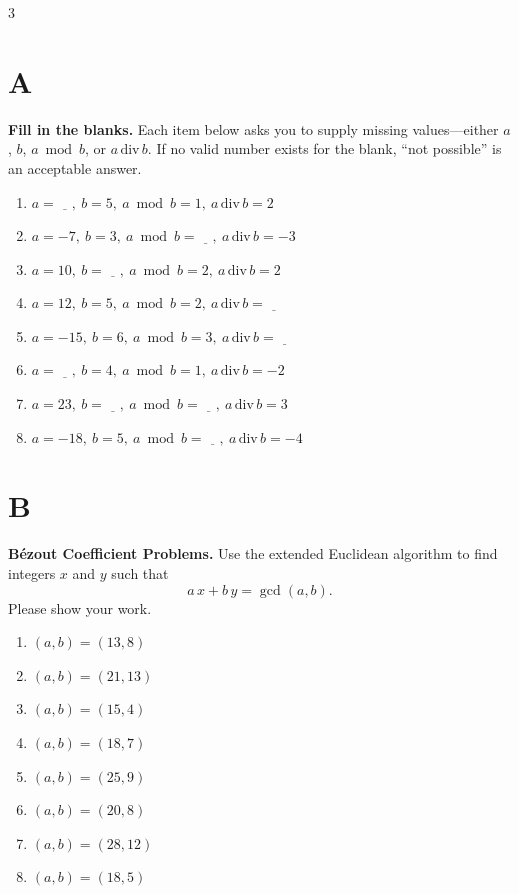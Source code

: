 \documentclass[9pt]{article}
\begin{document}
\small
\begin{multicols}{3}
\section*{A}
\textbf{Fill in the blanks.} Each item below asks you to supply missing values—either \(a\), \(b\), \(a \bmod b\), or \(a \,\mathrm{div}\, b\). If no valid number exists for the blank, “not possible” is an acceptable answer.

\begin{enumerate}
    \item $a = \underline{\quad},\ b = 5,\ a \bmod b = 1,\ a \,\mathrm{div}\, b = 2$ 
    \item $a = -7,\ b = 3,\ a \bmod b = \underline{\quad},\ a \,\mathrm{div}\, b = -3$ 
    \item $a = 10,\ b = \underline{\quad},\ a \bmod b = 2,\ a \,\mathrm{div}\, b = 2$ 
    \item $a = 12,\ b = 5,\ a \bmod b = 2,\ a \,\mathrm{div}\, b = \underline{\quad}$ 
    \item $a = -15,\ b = 6,\ a \bmod b = 3,\ a \,\mathrm{div}\, b = \underline{\quad}$ 
    \item $a = \underline{\quad},\ b = 4,\ a \bmod b = 1,\ a \,\mathrm{div}\, b = -2$ 
    \item $a = 23,\ b = \underline{\quad},\ a \bmod b = \underline{\quad},\ a \,\mathrm{div}\, b = 3$ 
    \item $a = -18,\ b = 5,\ a \bmod b = \underline{\quad},\ a \,\mathrm{div}\, b = -4$ 
\end{enumerate}


\section*{B}
\textbf{Bézout Coefficient Problems.}  Use the extended Euclidean algorithm to find integers \(x\) and \(y\) such that
\[
a\,x + b\,y = \gcd(a,b).
\]
Please show your work. 
\begin{enumerate}
    \item \((a,b) = (13, 8)\)
    \item \((a,b) = (21, 13)\)
    \item \((a,b) = (15, 4)\)
    \item \((a,b) = (18, 7)\)
    \item \((a,b) = (25, 9)\)
    \item \((a,b) = (20, 8)\)
    \item \((a,b) = (28, 12)\)
    \item \((a,b) = (18, 5)\)
\end{enumerate}


\end{multicols}
\end{document}
